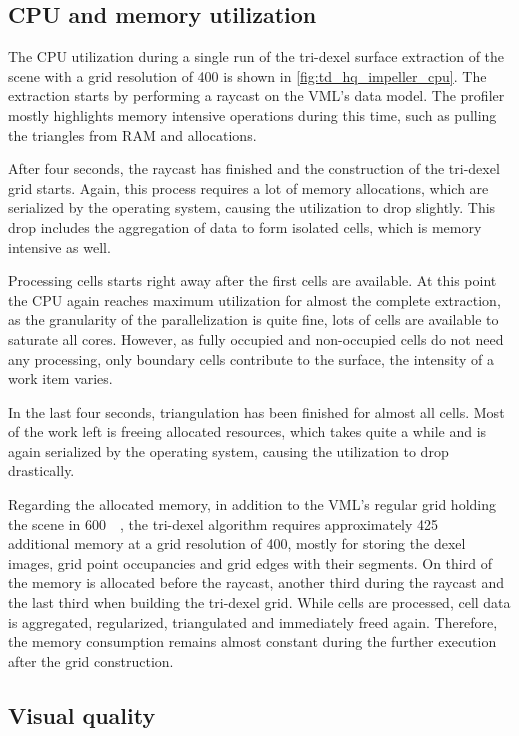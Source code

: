 \subsection{CPU and memory utilization}
\label{sec:tri_dexel_utilization}

The CPU utilization during a single run of the tri-dexel surface extraction of the \impeller scene with a grid resolution of 400 is shown in \cref{fig:td_hq_impeller_cpu}.
The extraction starts by performing a raycast on the VML's data model.
The profiler mostly highlights memory intensive operations during this time, such as pulling the triangles from RAM and allocations.

After four seconds, the raycast has finished and the construction of the tri-dexel grid starts.
Again, this process requires a lot of memory allocations, which are serialized by the operating system, causing the utilization to drop slightly.
This drop includes the aggregation of data to form isolated cells, which is memory intensive as well.

Processing cells starts right away after the first cells are available.
At this point the CPU again reaches maximum utilization for almost the complete extraction, as the granularity of the parallelization is quite fine, \ie lots of cells are available to saturate all cores.
However, as fully occupied and non-occupied cells do not need any processing, only boundary cells contribute to the surface, the intensity of a work item varies.

In the last four seconds, triangulation has been finished for almost all cells.
Most of the work left is freeing allocated resources, which takes quite a while and is again serialized by the operating system, causing the utilization to drop drastically.

Regarding the allocated memory, in addition to the VML's regular grid holding the \impeller scene in \SI{600}{\mebi\byte}, the tri-dexel algorithm requires approximately \SI{425}{\mebi\byte} additional memory at a grid resolution of 400, mostly for storing the dexel images, grid point occupancies and grid edges with their segments.
On third of the memory is allocated before the raycast, another third during the raycast and the last third when building the tri-dexel grid.
While cells are processed, cell data is aggregated, regularized, triangulated and immediately freed again.
Therefore, the memory consumption remains almost constant during the further execution after the grid construction.


\subsection{Visual quality}

